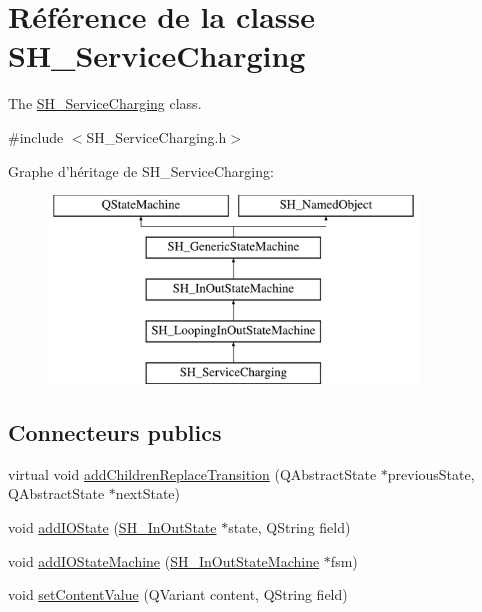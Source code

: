\hypertarget{classSH__ServiceCharging}{\section{Référence de la classe S\-H\-\_\-\-Service\-Charging}
\label{classSH__ServiceCharging}
}


The \hyperlink{classSH__ServiceCharging}{S\-H\-\_\-\-Service\-Charging} class.  




{\ttfamily \#include $<$S\-H\-\_\-\-Service\-Charging.\-h$>$}

Graphe d'héritage de S\-H\-\_\-\-Service\-Charging\-:\begin{figure}[H]
\begin{center}
\leavevmode
\includegraphics[height=5.000000cm]{classSH__ServiceCharging}
\end{center}
\end{figure}
\subsection*{Connecteurs publics}
\begin{DoxyCompactItemize}
\item 
virtual void \hyperlink{classSH__InOutStateMachine_ae0f3b4622d2c70884bb224dee86e95c0}{add\-Children\-Replace\-Transition} (Q\-Abstract\-State $\ast$previous\-State, Q\-Abstract\-State $\ast$next\-State)
\item 
void \hyperlink{classSH__InOutStateMachine_a2528cffddbe6f98c32ebef41423c0118}{add\-I\-O\-State} (\hyperlink{classSH__InOutState}{S\-H\-\_\-\-In\-Out\-State} $\ast$state, Q\-String field)
\item 
void \hyperlink{classSH__InOutStateMachine_a6f65dff277508e650eb697628c857b19}{add\-I\-O\-State\-Machine} (\hyperlink{classSH__InOutStateMachine}{S\-H\-\_\-\-In\-Out\-State\-Machine} $\ast$fsm)
\item 
void \hyperlink{classSH__InOutStateMachine_a9ab1534306b2bdb62743d4bcefe40c17}{set\-Content\-Value} (Q\-Variant content, Q\-String field)
\end{DoxyCompactItemize}
